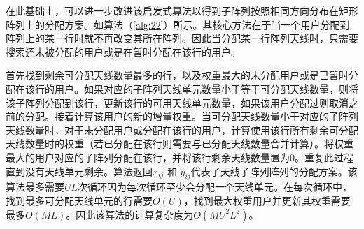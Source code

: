 在此基础上，可以进一步改进该启发式算法以得到子阵列按照相同方向分布在矩形阵列上的分配方案。如算法（\ref{alg:22}）所示。其核心方法在于当一个用户分配到阵列上的某一行时就不再改变其所在阵列。因此当分配某一行阵列天线时，只需要搜索还未被分配的用户或是在暂时分配在该行的用户。

首先找到剩余可分配天线数量最多的行，以及权重最大的未分配用户或是已暂时分配在该行的用户。如果对应的子阵列天线单元数量小于等于可分配天线数量，则将该子阵列分配到该行，更新该行的可用天线单元数量，如果该用户分配过则取消之前的分配。接着计算该用户的新的增量权重。当可分配天线数量小于对应的子阵列天线数量时，对于未分配用户或分配在该行的用户，计算使用该行所有剩余可分配天线数量时的权重（若已分配在该行则需要与已分配天线数量合并计算）。将权重最大的用户对应的子阵列分配在该行，并将该行剩余天线数量置为0。重复此过程直到没有天线单元剩余。算法返回$x_{ij}$ 和 $y_{ij}$代表了天线子阵列阵列的分配方案。该算法最多需要$UL$次循环因为每次循环至少会分配一个天线单元。在每次循环中，找到最多可分配天线单元的行需要$O(U)$，找到最大权重用户并更新其权重需要最多$O(ML)$。因此该算法的计算复杂度为$O(MU^2L^2)$。

